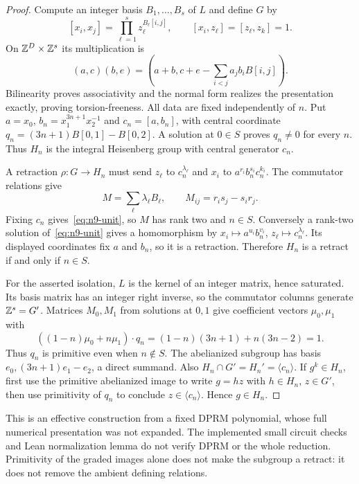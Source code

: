 \begin{proof}
Compute an integer basis $B_1,\ldots,B_s$ of $L$ and define $G$ by
\begin{equation}\label{eq:n9-group}
 [x_i,x_j]=\prod_{\ell=1}^s z_\ell^{B_\ell[i,j]},
 \qquad[x_i,z_\ell]=[z_\ell,z_k]=1.
\end{equation}
On $\mathbb Z^D\times\mathbb Z^s$ its multiplication is
\[
 (a,c)(b,e)=\left(a+b,c+e-\sum_{i<j}a_jb_iB[i,j]\right).
\]
Bilinearity proves associativity and the normal form realizes the
presentation exactly, proving torsion-freeness. All data are fixed
independently of $n$. Put $a=x_0$, $b_n=x_1^{3n+1}x_2^{-1}$ and
$c_n=[a,b_n]$, with central coordinate
$q_n=(3n+1)B[0,1]-B[0,2]$. A solution at $0\in S$ proves
$q_n\ne0$ for every $n$. Thus $H_n$ is the integral Heisenberg
group with central generator $c_n$.

A retraction $\rho:G\to H_n$ must send $z_\ell$ to
$c_n^{\lambda_\ell}$ and $x_i$ to $a^{r_i}b_n^{s_i}c_n^{k_i}$.
The commutator relations give
\[
 M=\sum_\ell\lambda_\ell B_\ell,\qquad
 M_{ij}=r_is_j-s_ir_j.
\]
Fixing $c_n$ gives~\eqref{eq:n9-unit}, so $M$ has rank two and
$n\in S$. Conversely a rank-two solution of~\eqref{eq:n9-unit}
gives a homomorphism by $x_i\mapsto a^{u_i}b_n^{v_i}$,
$z_\ell\mapsto c_n^{\lambda_\ell}$. Its displayed coordinates fix
$a$ and $b_n$, so it is a retraction. Therefore
$H_n$ is a retract if and only if $n\in S$.

For the asserted isolation, $L$ is the kernel of an integer matrix,
hence saturated. Its basis matrix has an integer right inverse, so
the commutator columns generate $\mathbb Z^s=G'$. Matrices $M_0,M_1$ from
solutions at $0,1$ give coefficient vectors $\mu_0,\mu_1$ with
\[
 ((1-n)\mu_0+n\mu_1)\mathbin{\cdot}q_n
 =(1-n)(3n+1)+n(3n-2)=1.
\]
Thus $q_n$ is primitive even when $n\notin S$. The abelianized
subgroup has basis $e_0,(3n+1)e_1-e_2$, a direct summand. Also
$H_n\cap G'=H_n'=\langle c_n\rangle$. If $g^k\in H_n$,
first use the primitive abelianized image to write $g=hz$ with
$h\in H_n$, $z\in G'$, then use primitivity of $q_n$ to conclude
$z\in\langle c_n\rangle$. Hence $g\in H_n$.
\end{proof}

This is an effective construction from a fixed DPRM polynomial, whose
full numerical presentation was not expanded. The implemented small
circuit checks and Lean normalization lemma do not verify DPRM or the
whole reduction. Primitivity of the graded images alone does not make
the subgroup a retract: it does not remove the ambient defining relations.
